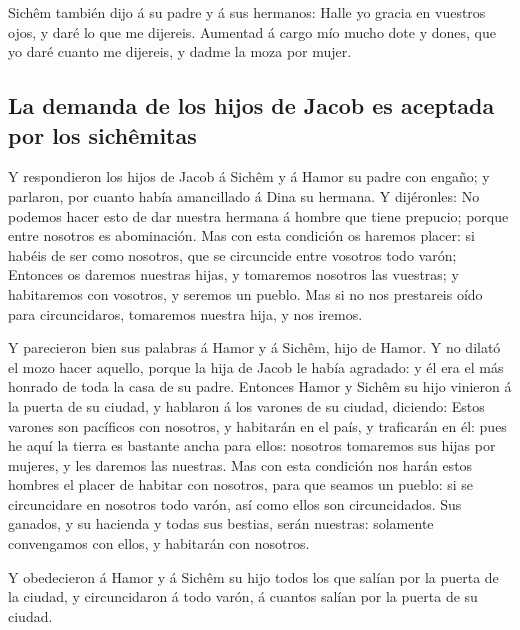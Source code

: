  Sichêm también dijo á su padre y á sus hermanos: Halle
yo gracia en vuestros ojos, y daré lo que me dijereis. 
Aumentad á cargo mío mucho dote y dones, que yo daré cuanto me dijereis,
y dadme la moza por mujer.

\hypertarget{la-demanda-de-los-hijos-de-jacob-es-aceptada-por-los-sichuxeamitas}{%
\subsection{La demanda de los hijos de Jacob es aceptada por los
sichêmitas}\label{la-demanda-de-los-hijos-de-jacob-es-aceptada-por-los-sichuxeamitas}}

 Y respondieron los hijos de Jacob á Sichêm y á Hamor su
padre con engaño; y parlaron, por cuanto había amancillado á Dina su
hermana.  Y dijéronles: No podemos hacer esto de dar
nuestra hermana á hombre que tiene prepucio; porque entre nosotros es
abominación.  Mas con esta condición os haremos placer:
si habéis de ser como nosotros, que se circuncide entre vosotros todo
varón;  Entonces os daremos nuestras hijas, y tomaremos
nosotros las vuestras; y habitaremos con vosotros, y seremos un pueblo.
 Mas si no nos prestareis oído para circuncidaros,
tomaremos nuestra hija, y nos iremos.

 Y parecieron bien sus palabras á Hamor y á Sichêm, hijo
de Hamor.  Y no dilató el mozo hacer aquello, porque la
hija de Jacob le había agradado: y él era el más honrado de toda la casa
de su padre.  Entonces Hamor y Sichêm su hijo vinieron á
la puerta de su ciudad, y hablaron á los varones de su ciudad, diciendo:
 Estos varones son pacíficos con nosotros, y habitarán en
el país, y traficarán en él: pues he aquí la tierra es bastante ancha
para ellos: nosotros tomaremos sus hijas por mujeres, y les daremos las
nuestras.  Mas con esta condición nos harán estos hombres
el placer de habitar con nosotros, para que seamos un pueblo: si se
circuncidare en nosotros todo varón, así como ellos son circuncidados.
 Sus ganados, y su hacienda y todas sus bestias, serán
nuestras: solamente convengamos con ellos, y habitarán con nosotros.

 Y obedecieron á Hamor y á Sichêm su hijo todos los que
salían por la puerta de la ciudad, y circuncidaron á todo varón, á
cuantos salían por la puerta de su ciudad.

